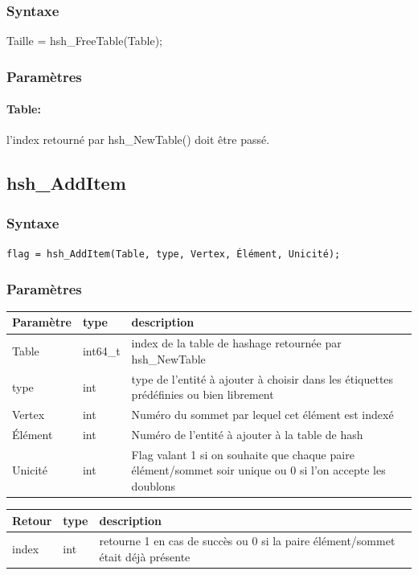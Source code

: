 \documentclass[a4paper,12pt]{article}
\begin{document}
\subsubsection*{Syntaxe}
Taille = hsh\_FreeTable(Table);

\subsubsection*{Paramètres}
\paragraph{Table:} l'index retourné par hsh\_NewTable() doit être passé.


\subsection{hsh\_AddItem}

\subsubsection*{Syntaxe}
{\tt flag = hsh\_AddItem(Table, type, Vertex, Élément, Unicité);}

\subsubsection*{Paramètres}
\begin{tabular}{|m{3cm}|m{2cm}|m{8.5cm}|}
\hline
Paramètre  & type     & description \\
\hline
Table      & int64\_t  & index de la table de hashage retournée par hsh\_NewTable \\
\hline
type       & int      & type de l'entité à ajouter à choisir dans les étiquettes prédéfinies ou bien librement \\
\hline
Vertex     & int      & Numéro du sommet par lequel cet élément est indexé \\
\hline
Élément    & int      & Numéro de l'entité à ajouter à la table de hash \\
\hline
Unicité    & int      & Flag valant 1 si on souhaite que chaque paire élément/sommet soir unique ou 0 si l'on accepte les doublons \\
\hline
\end{tabular}

\medskip

\begin{tabular}{|m{3cm}|m{2cm}|m{8.5cm}|}
\hline
Retour     & type   & description \\
\hline
index      & int    & retourne 1 en cas de succès ou 0 si la paire élément/sommet était déjà présente \\
\hline
\end{tabular}
\end{document}
